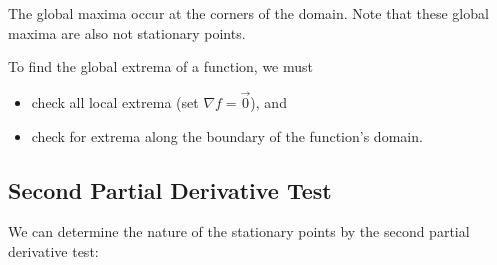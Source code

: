 The global maxima occur at the corners of the domain. Note that these global maxima are also not stationary points.

\begin{recipe}
    To find the global extrema of a function, we must
    \begin{itemize}
        \item check all local extrema (set $\nabla f = \vec 0$), and
        \item check for extrema along the boundary of the function's domain.
    \end{itemize}
\end{recipe}

\subsection{Second Partial Derivative Test}

We can determine the nature of the stationary points by the second partial derivative test:

